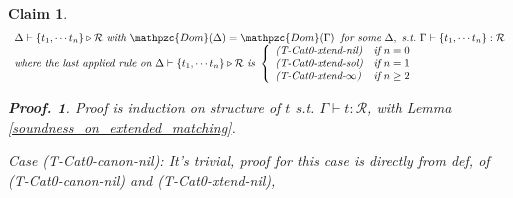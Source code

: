 \documentclass[12pt]{article}
\newtheorem{Claim}{Claim}[section]
\newtheorem{Proof}{Proof.}
\begin{document}
\begin{Claim}
  \label{claim_for_soundness_on_extended_matching_2}
  \[ \begin{array}{l}
       \Delta \vdash \{t_1, \cdots t_n\} \triangleright \mathcal{R}\
        \text{\it with}\ \mathpzc{Dom}(\Delta) = \mathpzc{Dom}(\Gamma)\;\;
         \text{\it for some}\ \Delta,\ \text{\it s.t.}\
         \Gamma \vdash \{t_1, \cdots t_n\}  : \mathcal{R}  \\
       
       \text{\it where the last applied rule on}\
        \Delta \vdash \{t_1, \cdots t_n\} \triangleright
         \mathcal{R}\ \mathcal{\it is}\
       \left\{\begin{array}[c]{ll}
         \text{\it (T-Cat0-xtend-nil)}  &  \text{\it if}\ n = 0  \\
         \text{\it (T-Cat0-xtend-sol)}  &  \text{\it if}\ n = 1  \\
         \text{\it (T-Cat0-xtend-$\infty$)}  &  \text{\it if}\ n \ge 2
       \end{array}\right.
     \end{array}
  \]
  \begin{Proof}
    Proof is induction on structure of $t$ s.t.
    $\Gamma \vdash t : \mathcal{R}$, with
    Lemma \ref{soundness_on_extended_matching}.
    
    Case (T-Cat0-canon-nil): It's trivial, proof for this case is directly
    from def, of (T-Cat0-canon-nil) and (T-Cat0-xtend-nil),
        

\end{Proof}
\end{Claim}
\end{document}
